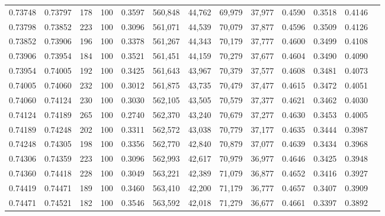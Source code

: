 \begin{tabular}{rrrrrrrrrrrrr}
0.73748 & 0.73797 &   178 & 100 &                                     0.3597 & 560,848 &  44,762 &  69,979 &  37,977 & 0.4590 & 0.3518 & 0.4146 \\
0.73798 & 0.73852 &   223 & 100 &                                     0.3096 & 561,071 &  44,539 &  70,079 &  37,877 & 0.4596 & 0.3509 & 0.4126 \\
0.73852 & 0.73906 &   196 & 100 &                                     0.3378 & 561,267 &  44,343 &  70,179 &  37,777 & 0.4600 & 0.3499 & 0.4108 \\
0.73906 & 0.73954 &   184 & 100 &                                     0.3521 & 561,451 &  44,159 &  70,279 &  37,677 & 0.4604 & 0.3490 & 0.4090 \\
0.73954 & 0.74005 &   192 & 100 &                                     0.3425 & 561,643 &  43,967 &  70,379 &  37,577 & 0.4608 & 0.3481 & 0.4073 \\
0.74005 & 0.74060 &   232 & 100 &                                     0.3012 & 561,875 &  43,735 &  70,479 &  37,477 & 0.4615 & 0.3472 & 0.4051 \\
0.74060 & 0.74124 &   230 & 100 &                                     0.3030 & 562,105 &  43,505 &  70,579 &  37,377 & 0.4621 & 0.3462 & 0.4030 \\
0.74124 & 0.74189 &   265 & 100 &                                     0.2740 & 562,370 &  43,240 &  70,679 &  37,277 & 0.4630 & 0.3453 & 0.4005 \\
0.74189 & 0.74248 &   202 & 100 &                                     0.3311 & 562,572 &  43,038 &  70,779 &  37,177 & 0.4635 & 0.3444 & 0.3987 \\
0.74248 & 0.74305 &   198 & 100 &                                     0.3356 & 562,770 &  42,840 &  70,879 &  37,077 & 0.4639 & 0.3434 & 0.3968 \\
0.74306 & 0.74359 &   223 & 100 &                                     0.3096 & 562,993 &  42,617 &  70,979 &  36,977 & 0.4646 & 0.3425 & 0.3948 \\
0.74360 & 0.74418 &   228 & 100 &                                     0.3049 & 563,221 &  42,389 &  71,079 &  36,877 & 0.4652 & 0.3416 & 0.3927 \\
0.74419 & 0.74471 &   189 & 100 &                                     0.3460 & 563,410 &  42,200 &  71,179 &  36,777 & 0.4657 & 0.3407 & 0.3909 \\
0.74471 & 0.74521 &   182 & 100 &                                     0.3546 & 563,592 &  42,018 &  71,279 &  36,677 & 0.4661 & 0.3397 & 0.3892 \\

\end{tabular}

